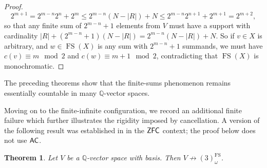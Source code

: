 \documentclass{amsart}
\newtheorem{theorem}{Theorem}[section]
\theoremstyle{definition}
\newcommand{\ac}{\mathnormal{\mathsf{AC}}}
\newcommand{\zfc}{\mathnormal{\mathsf{ZFC}}}
\theoremstyle{remark}
\numberwithin{equation}{section}
\begin{document}
\begin{proof}
        \begin{equation*} 
        2^{m+1}= 
        2^{m-n}2^{n}+2^{m}\leq 
        2^{m-n}(N-|R|)+N\leq 
        2^{m-n}2^{n+1}+2^{m+1}= 
        2^{m+2},
        \end{equation*}
        so that any finite sum of $2^{m-n}+1$ elements from $V$ must have a support with cardinality $|R|+(2^{m-n}+1)(N-|R|)=2^{m-n}(N-|R|)+N$. So if $v\in X$ is arbitrary, and $w\in\operatorname{FS}(X)$ is any sum with $2^{m-n}+1$ summands, we must have $c(v)\equiv m\mod 2$ and $c(w) \equiv m+1\mod2$, contradicting that $\operatorname{FS}(X)$ is monochromatic.
    \end{proof}

The preceding theorems show that the finite-sums phenomenon remains essentially countable in many $\mathbb{Q}$-vector spaces.

Moving on to the finite-infinite configuration, we record an additional finite failure which further illustrates the rigidity imposed by cancellation. A version of the following result was established in \cite[Theorem 5]{FernandezLee2020} in the $\zfc$ context; the proof below does not use $\ac$.

\begin{theorem}\label{thm:hindman-three-colors-fails}
Let $V$ be a $\mathbb{Q}$-vector space with basis. 
Then $V\not\to(3)^{\operatorname{FS}}_{\omega}$.
\end{theorem}
\end{document}

